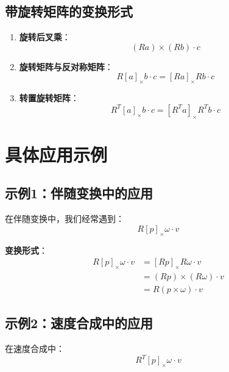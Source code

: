 \documentclass[12pt,a4paper]{article}
\begin{document}
\subsection{带旋转矩阵的变换形式}

\begin{enumerate}
\item \textbf{旋转后叉乘}：
\begin{equation}
(Ra) \times (Rb) \cdot c
\end{equation}

\item \textbf{旋转矩阵与反对称矩阵}：
\begin{equation}
R [a]_{\times} b \cdot c = [Ra]_{\times} R b \cdot c
\end{equation}

\item \textbf{转置旋转矩阵}：
\begin{equation}
R^T [a]_{\times} b \cdot c = [R^T a]_{\times} R^T b \cdot c
\end{equation}
\end{enumerate}

\section{具体应用示例}

\subsection{示例1：伴随变换中的应用}

在伴随变换中，我们经常遇到：
\begin{equation}
R [p]_{\times} \omega \cdot v
\end{equation}

\textbf{变换形式}：
\begin{align}
R [p]_{\times} \omega \cdot v &= [Rp]_{\times} R \omega \cdot v \\
&= (Rp) \times (R \omega) \cdot v \\
&= R (p \times \omega) \cdot v
\end{align}

\subsection{示例2：速度合成中的应用}

在速度合成中：
\begin{equation}
R^T [p]_{\times} \omega \cdot v
\end{equation}
\end{document}
